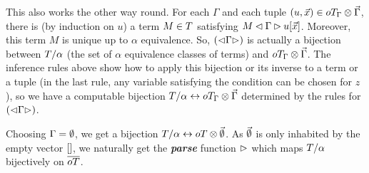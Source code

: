 \documentclass[submission,copyright,creativecommons]{eptcs}
\newcommand{\define}[1]{\mbox{\textbf{\textit{#1}}}}
\begin{document}
This also works the other way round. For each $\Gamma$ and each tuple
$(u, \vec x) \in oT_\Gamma \otimes \vec \Gamma$, there is (by induction on $u$) a
term $M \in T$ satisfying ${M \lhd \Gamma \rhd u[\vec x]}$. Moreover,
this term $M$ is unique up to $\alpha$ equivalence. So, ${\left(\mathord{\lhd} {\Gamma} \mathord{\rhd}\right)}$ is actually a bijection between $T / \alpha$ (the set of
$\alpha$ equivalence classes of terms) and $oT_\Gamma \otimes \vec \Gamma$. The
inference rules above show how to apply this bijection or its inverse
to a term or a tuple (in the last rule, any variable satisfying the
condition can be chosen for $z$), so we have 
a computable bijection $T / \alpha \leftrightarrow oT_\Gamma \otimes \vec \Gamma$
determined by the rules for ${\left(\mathord{\lhd} {\Gamma} \mathord{\rhd}\right)}$.

Choosing $\Gamma = \emptyset$, we get a bijection $T/\alpha
\leftrightarrow oT \otimes {\vec {\emptyset}}$.  As $\vec {\emptyset}$ is
only inhabited by the empty vector $[]$, we naturally get the
\define{parse} function $\mathop{\rhd}$ which maps $T / \alpha$
bijectively on $\overline{oT}$.


\end{document}
